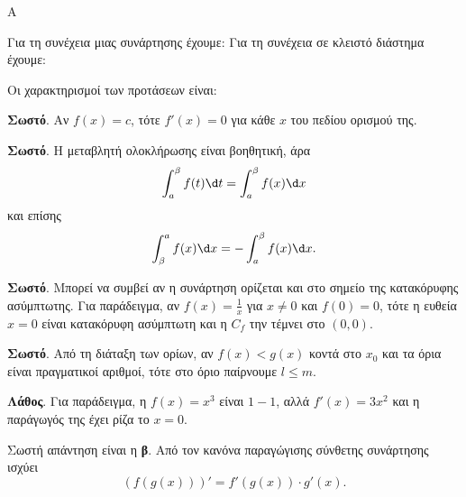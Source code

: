 \begin{thema}{Α}
\begin{erwthma}
\item {}

\item {}

\item Για τη συνέχεια μιας συνάρτησης έχουμε:
Για τη συνέχεια σε κλειστό διάστημα έχουμε:

\item Οι χαρακτηρισμοί των προτάσεων είναι:
\begin{alist}
\item \textbf{Σωστό}. Αν $f(x)=c$, τότε $f'(x)=0$ για κάθε $x$ του πεδίου ορισμού της.
\item \textbf{Σωστό}. Η μεταβλητή ολοκλήρωσης είναι βοηθητική, άρα
\[ \dint_a^\beta f(t)\d t=\dint_a^\beta f(x)\d x \]
και επίσης
\[ \dint_\beta^a f(x)\d x=-\dint_a^\beta f(x)\d x. \]
\item \textbf{Σωστό}. Μπορεί να συμβεί αν η συνάρτηση ορίζεται και στο σημείο της κατακόρυφης ασύμπτωτης. Για παράδειγμα, αν $f(x)=\frac{1}{x}$ για $x\neq0$ και $f(0)=0$, τότε η ευθεία $x=0$ είναι κατακόρυφη ασύμπτωτη και η $C_f$ την τέμνει στο $(0,0)$.
\item \textbf{Σωστό}. Από τη διάταξη των ορίων, αν $f(x)<g(x)$ κοντά στο $x_0$ και τα όρια είναι πραγματικοί αριθμοί, τότε στο όριο παίρνουμε $l\leq m$.
\item \textbf{Λάθος}. Για παράδειγμα, η $f(x)=x^3$ είναι $1-1$, αλλά $f'(x)=3x^2$ και η παράγωγός της έχει ρίζα το $x=0$.
\end{alist}

\item Σωστή απάντηση είναι η \textbf{β}. Από τον κανόνα παραγώγισης σύνθετης συνάρτησης ισχύει
\[ \left(f(g(x))\right)'=f'(g(x))\cdot g'(x). \]
\end{erwthma}
\end{thema}

